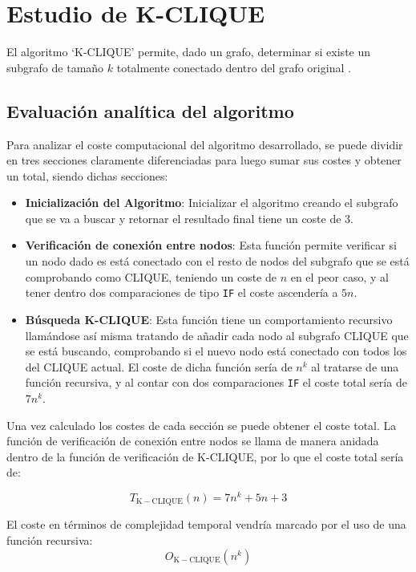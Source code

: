 \section{Estudio de K-CLIQUE}\label{sec:clique}
El algoritmo `K-CLIQUE' permite, dado un grafo, determinar si existe un subgrafo de tamaño $k$ totalmente conectado dentro del grafo original \parencite{bomze1999maximum}.


\subsection*{Evaluación analítica del algoritmo}
Para analizar el coste computacional del algoritmo desarrollado, se puede dividir en tres secciones claramente diferenciadas para luego sumar sus costes y obtener un total, siendo dichas secciones: 

\begin{itemize}
    \item \textbf{Inicialización del Algoritmo}: Inicializar el algoritmo creando el subgrafo que se va a buscar y retornar el resultado final tiene un coste de 3.
    \item \textbf{Verificación de conexión entre nodos}: Esta función permite verificar si un nodo dado es está conectado con el resto de nodos del subgrafo que se está comprobando como CLIQUE, teniendo un coste de $n$ en el peor caso, y al tener dentro dos comparaciones de tipo \texttt{IF} el coste ascendería a $5n$.
    \item \textbf{Búsqueda K-CLIQUE}: Esta función tiene un comportamiento recursivo llamándose así misma tratando de añadir cada nodo al subgrafo CLIQUE que se está buscando, comprobando si el nuevo nodo está conectado con todos los del CLIQUE actual.
    El coste de dicha función sería de $n^k$ al tratarse de una función recursiva, y al contar con dos comparaciones \texttt{IF} el coste total sería de $7n^k$.
\end{itemize}

Una vez calculado los costes de cada sección se puede obtener el coste total. La función de verificación de conexión entre nodos se llama de  manera anidada dentro de la función de verificación de K-CLIQUE, por lo que el coste total sería de:

\begin{equation}
    T_{\mathrm{K-CLIQUE}}(n) = 7n^k + 5n +3
\end{equation}

El coste en términos de complejidad temporal vendría marcado por el uso de una función recursiva: 
\begin{equation}
    O_{\mathrm{K-CLIQUE}}(n^k) 
\end{equation}



